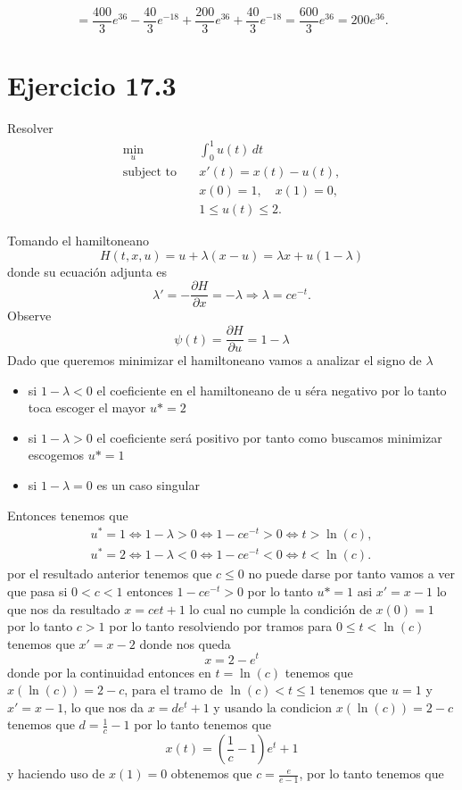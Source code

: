 \documentclass{uofa-eng-assignment}
\newcommand{\la}{\lambda}
\begin{document}
    \[
    =
    \frac{400}{3}e^{36}
    -
    \frac{40}{3}e^{-18}
    +
    \frac{200}{3}e^{36}
    +
    \frac{40}{3}e^{-18}
    =
    \frac{600}{3}e^{36}
    =
    200e^{36}.
    \]   
\section*{Ejercicio 17.3}
Resolver
\[
\begin{aligned}
\min_{u} \quad & \int_0^1 u(t)\,dt \\
\text{subject to} \quad &
x'(t)=x(t)-u(t), \\
& x(0)=1,\quad x(1)=0, \\
& 1 \le u(t) \le 2.
\end{aligned}
\]

Tomando el hamiltoneano
\[
H(t,x,u)=  u+\la (x-u) = \la x +u(1-\la)
\]
donde su ecuación adjunta es 
 \[
 \la' = -\frac{\partial H}{\partial x} = -\la  \Rightarrow \la = ce^{-t}.
 \]
 Observe
 \[
 \psi (t) = \frac{\partial H}{\partial u} =1 -\la 
 \]
Dado que queremos minimizar el hamiltoneano vamos a analizar el signo de $\la$
\begin{itemize}
    \item si $1-\la <0$ el coeficiente en el hamiltoneano de u séra negativo  por lo tanto toca escoger el mayor $u*=2$
    \item  si $1-\la >0$ el coeficiente será positivo por tanto como buscamos minimizar escogemos $u*=1$
    \item si $1-\la = 0$ es un caso singular
\end{itemize}
Entonces tenemos que 
\begin{align*}
    u^*=1 \iff 1-\lambda>0 \iff 1-ce^{-t}>0 \iff t> \ln(c),\\
    u^*=2 \iff 1-\la <0 \iff  1-ce^{-t}<0 \iff t< \ln(c).
\end{align*}
por el resultado anterior tenemos que $c\leq0$ no puede darse por tanto vamos a ver que pasa si $0<c<1$ entonces
$1-ce^{-t}>0$ por lo tanto $u*=1$ asi $x'=x-1$ lo que nos da resultado  $x=ce{t}+1$ lo cual no cumple la condición de $x(0)=1$ por lo tanto
$c>1$
por lo tanto resolviendo por tramos para $0\leq t< \ln(c)$ tenemos que $x'=x-2$ donde nos queda 
\[
x=2-e^t
\] 
donde por la continuidad entonces en $t=\ln(c)$ tenemos que $x(\ln(c))=2-c$,
para el tramo de $\ln(c)<t\leq 1$ tenemos que $u=1$ y $x'=x-1$, lo que nos da $x=de^t+1$ y usando la condicion $x(\ln(c))=2-c$
tenemos que $d= \frac{1}{c}-1$
por lo tanto tenemos que 
\[
x(t)= (\frac{1}{c}-1)e^t+1
\]
y haciendo uso de $x(1)=0$ obtenemos que $c= \frac{e}{e-1}$, por lo tanto tenemos que 
\end{document}
